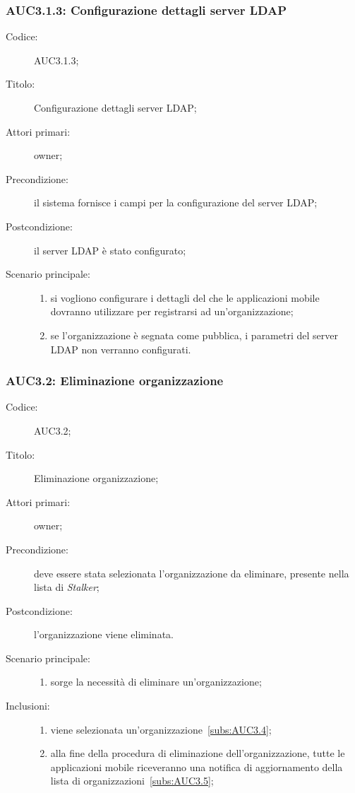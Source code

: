 \documentclass[../../../analisi-dei-requisiti.tex]{subfiles}
\begin{document}
\subsubsection{AUC3.1.3: Configurazione dettagli server LDAP}%
\label{subs:AUC3.1.3}
\begin{description}
  \item[Codice:] AUC3.1.3;
  \item[Titolo:] Configurazione dettagli server LDAP;
  \item[Attori primari:] owner;
  \item[Precondizione:] il sistema fornisce i campi per la configurazione del server LDAP;
  \item[Postcondizione:] il server LDAP è stato configurato;
  \item[Scenario principale:]
        \begin{enumerate}
          \item si vogliono configurare i dettagli del  che le applicazioni mobile dovranno utilizzare per registrarsi ad un'organizzazione;
          \item se l'organizzazione è segnata come pubblica, i parametri del server LDAP non verranno configurati.
        \end{enumerate}
\end{description}

\subsubsection{AUC3.2: Eliminazione organizzazione}%
\label{subs:AUC3.2}
\begin{description}
  \item[Codice:] AUC3.2;
  \item[Titolo:] Eliminazione organizzazione;
  \item[Attori primari:] owner;
  \item[Precondizione:] deve essere stata selezionata l'organizzazione da eliminare, presente nella lista di \emph{Stalker};
  \item[Postcondizione:] l'organizzazione viene eliminata.
  \item[Scenario principale:]
        \begin{enumerate}
          \item sorge la necessità di eliminare un'organizzazione;
        \end{enumerate}
  \item[Inclusioni:]
        \begin{enumerate}
          \item viene selezionata un'organizzazione~\ref{subs:AUC3.4};
          \item alla fine della procedura di eliminazione dell'organizzazione, tutte le applicazioni mobile riceveranno una notifica di aggiornamento della lista di organizzazioni~\ref{subs:AUC3.5};
        \end{enumerate}
\end{description}
\end{document}
